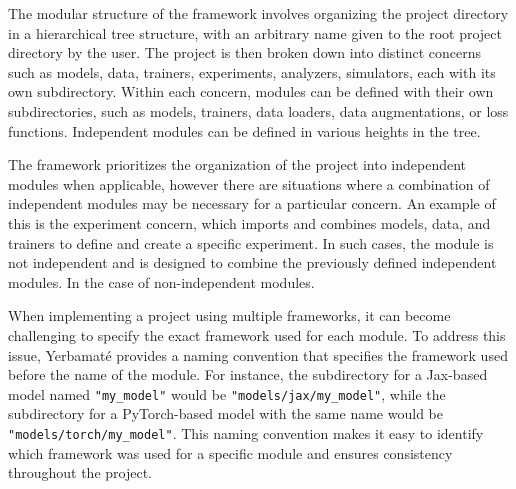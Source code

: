  The modular structure of the framework involves organizing the project directory in a hierarchical tree structure, with an arbitrary name given to the root project directory by the user. The project is then broken down into distinct concerns such as models, data, trainers, experiments, analyzers, simulators, each with its own subdirectory. Within each concern, modules can be defined with their own subdirectories, such as models, trainers, data loaders, data augmentations, or loss functions. Independent modules can be defined in various heights in the tree.

The framework prioritizes the organization of the project into independent modules when applicable, however there are situations where a combination of independent modules may be necessary for a particular concern. An example of this is the experiment concern, which imports and combines models, data, and trainers to define and create a specific experiment. In such cases, the module is not independent and is designed to combine the previously defined independent modules. In the case of non-independent modules. 

When implementing a project using multiple frameworks, it can become challenging to specify the exact framework used for each module. To address this issue, Yerbamaté provides a naming convention that specifies the framework used before the name of the module. For instance, the subdirectory for a Jax-based model named \texttt{"my\_model"} would be \texttt{"models/jax/my\_model"}, while the subdirectory for a PyTorch-based model with the same name would be \texttt{"models/torch/my\_model"}. This naming convention makes it easy to identify which framework was used for a specific module and ensures consistency throughout the project.





